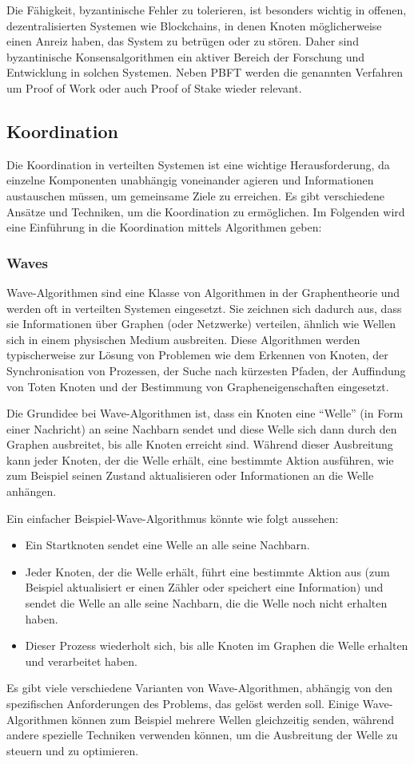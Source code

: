 Die Fähigkeit, byzantinische Fehler zu tolerieren, ist besonders wichtig in offenen, dezentralisierten Systemen wie Blockchains, in denen Knoten möglicherweise einen Anreiz haben, das System zu betrügen oder zu stören. Daher sind byzantinische Konsensalgorithmen ein aktiver Bereich der Forschung und Entwicklung in solchen Systemen. Neben PBFT werden die genannten Verfahren um Proof of Work oder auch Proof of Stake wieder relevant.  

\subsection{Koordination}

Die Koordination in verteilten Systemen ist eine wichtige Herausforderung, da einzelne Komponenten unabhängig voneinander agieren und Informationen austauschen müssen, um gemeinsame Ziele zu erreichen. Es gibt verschiedene Ansätze und Techniken, um die Koordination zu ermöglichen. Im Folgenden wird eine Einführung in die Koordination mittels Algorithmen geben:

\subsubsection{Waves}
Wave-Algorithmen sind eine Klasse von Algorithmen in der Graphentheorie und werden oft in verteilten Systemen eingesetzt. Sie zeichnen sich dadurch aus, dass sie Informationen über Graphen (oder Netzwerke) verteilen, ähnlich wie Wellen sich in einem physischen Medium ausbreiten. Diese Algorithmen werden typischerweise zur Lösung von Problemen wie dem Erkennen von Knoten, der Synchronisation von Prozessen, der Suche nach kürzesten Pfaden, der Auffindung von Toten Knoten und der Bestimmung von Grapheneigenschaften eingesetzt.

Die Grundidee bei Wave-Algorithmen ist, dass ein Knoten eine \enquote{Welle} (in Form einer Nachricht) an seine Nachbarn sendet und diese Welle sich dann durch den Graphen ausbreitet, bis alle Knoten erreicht sind. Während dieser Ausbreitung kann jeder Knoten, der die Welle erhält, eine bestimmte Aktion ausführen, wie zum Beispiel seinen Zustand aktualisieren oder Informationen an die Welle anhängen.

Ein einfacher Beispiel-Wave-Algorithmus könnte wie folgt aussehen:
\begin{itemize}
\item Ein Startknoten sendet eine Welle an alle seine Nachbarn.
\item Jeder Knoten, der die Welle erhält, führt eine bestimmte Aktion aus (zum Beispiel aktualisiert er einen Zähler oder speichert eine Information) und sendet die Welle an alle seine Nachbarn, die die Welle noch nicht erhalten haben.
\item Dieser Prozess wiederholt sich, bis alle Knoten im Graphen die Welle erhalten und verarbeitet haben.
\end{itemize}
Es gibt viele verschiedene Varianten von Wave-Algorithmen, abhängig von den spezifischen Anforderungen des Problems, das gelöst werden soll. Einige Wave-Algorithmen können zum Beispiel mehrere Wellen gleichzeitig senden, während andere spezielle Techniken verwenden können, um die Ausbreitung der Welle zu steuern und zu optimieren.

